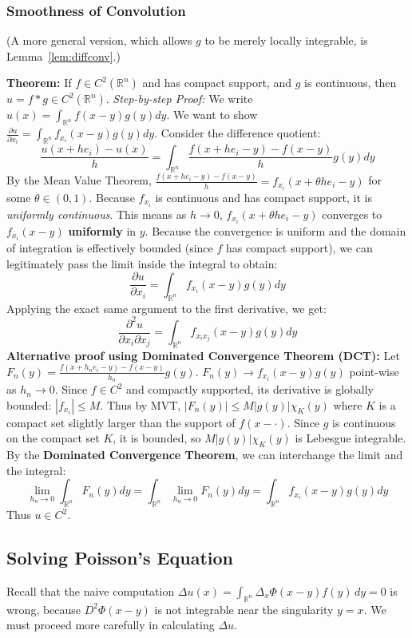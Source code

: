 \documentclass[11pt]{article}
\theoremstyle{plain}
\theoremstyle{definition}
\theoremstyle{remark}
\begin{document}
\subsubsection{Smoothness of Convolution}
(A more general version, which allows $g$ to be merely locally integrable, is Lemma~\ref{lem:diffconv}.)

\textbf{Theorem:} If $f \in C^2(\mathbb{R}^n)$ and has compact support, and $g$ is continuous, then $u = f * g \in C^2(\mathbb{R}^n)$.
\textit{Step-by-step Proof:}
We write $u(x) = \int_{\mathbb{R}^n} f(x-y) g(y) dy$.
We want to show $\frac{\partial u}{\partial x_i} = \int_{\mathbb{R}^n} f_{x_i}(x-y) g(y) dy$.
Consider the difference quotient:
$$ \frac{u(x + h e_i) - u(x)}{h} = \int_{\mathbb{R}^n} \frac{f(x + h e_i - y) - f(x-y)}{h} g(y) dy $$
By the Mean Value Theorem, $\frac{f(x + h e_i - y) - f(x-y)}{h} = f_{x_i}(x + \theta h e_i - y)$ for some $\theta \in (0,1)$.
Because $f_{x_i}$ is continuous and has compact support, it is \textit{uniformly continuous}. This means as $h \to 0$, $f_{x_i}(x + \theta h e_i - y)$ converges to $f_{x_i}(x-y)$ \textbf{uniformly} in $y$.
Because the convergence is uniform and the domain of integration is effectively bounded (since $f$ has compact support), we can legitimately pass the limit inside the integral to obtain:
$$ \frac{\partial u}{\partial x_i} = \int_{\mathbb{R}^n} f_{x_i}(x-y) g(y) dy $$
Applying the exact same argument to the first derivative, we get:
$$ \frac{\partial^2 u}{\partial x_i \partial x_j} = \int_{\mathbb{R}^n} f_{x_i x_j}(x-y) g(y) dy $$
\textbf{Alternative proof using Dominated Convergence Theorem (DCT):}
Let $F_n(y) = \frac{f(x + h_n e_i - y) - f(x-y)}{h_n} g(y)$. 
$F_n(y) \to f_{x_i}(x-y)g(y)$ point-wise as $h_n \to 0$.
Since $f \in C^2$ and compactly supported, its derivative is globally bounded: $|f_{x_i}| \leq M$. Thus by MVT, $|F_n(y)| \leq M |g(y)| \chi_K(y)$ where $K$ is a compact set slightly larger than the support of $f(x-\cdot)$.
Since $g$ is continuous on the compact set $K$, it is bounded, so $M |g(y)| \chi_K(y)$ is Lebesgue integrable.
By the \textbf{Dominated Convergence Theorem}, we can interchange the limit and the integral:
$$ \lim_{h_n \to 0} \int_{\mathbb{R}^n} F_n(y) dy = \int_{\mathbb{R}^n} \lim_{h_n \to 0} F_n(y) dy = \int_{\mathbb{R}^n} f_{x_i}(x-y) g(y) dy $$
Thus $u \in C^2$.

\subsection{Solving Poisson's Equation}
Recall that the naive computation $\Delta u(x) = \int_{\mathbb{R}^n} \Delta_x \Phi(x-y) f(y)\, dy = 0$ is wrong, because $D^2\Phi(x-y)$ is not integrable near the singularity $y = x$. We must proceed more carefully in calculating $\Delta u$.
\end{document}

